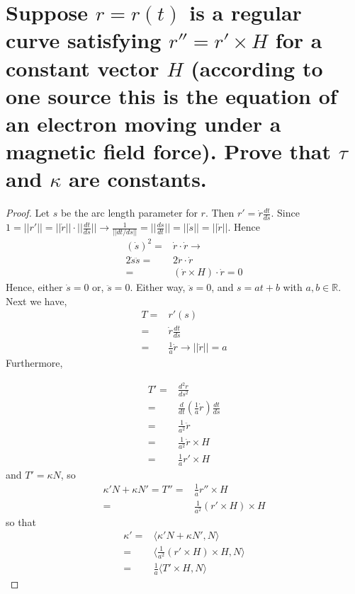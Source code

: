 \documentclass[12pt]{amsart}
\begin{document}
\section{Suppose $r=r(t)$ is a regular curve satisfying $r''=r'\times H$ for a constant vector $H$ (according to one source this is the equation of an electron moving under a magnetic field force). Prove that $\tau$ and $\kappa$ are constants.}
\begin{proof}
Let $s$ be the arc length parameter for $r$. Then $r'=\dot r\frac{dt}{ds}$. Since $1=||r'||=||\dot r||\cdot||\frac{dt}{ds}||\rightarrow\frac{1}{||dt/ds||}=||\frac{ds}{dt}||=||\dot s||=||\dot r||$. Hence 
\begin{align*}
	\left(\dot s\right)^2=&\dot r\cdot\dot r\rightarrow
	\\2\dot s\ddot s=&2\ddot r\cdot\dot r
	\\=&(\dot r\times H)\cdot \dot r=0
\end{align*}
Hence, either $\dot s=0$ or, $\ddot s=0$. Either way, $\ddot s=0$, and $s=at+b$ with $a,b\in\mathbb{R}$. Next we have,
\begin{align*}
	T=&r'(s)
	\\=&\dot r\frac{dt}{ds}
	\\=&\frac{1}{a}\dot r\rightarrow||\dot r||=a
\end{align*}
Furthermore,
\begin{comment}\begin{align*}
	0=&T\cdot N
	\\=&r'\cdot N
\end{align*}
\end{comment}
\begin{align*}
	T'=&\frac{d^2r}{ds^2}
	\\=&\frac{d}{dt}\left(\frac{1}{a}\dot r\right)\frac{dt}{ds}
	\\=&\frac{1}{a^2}\ddot r
	\\=&\frac{1}{a^2}\dot r\times H
	\\=&\frac{1}{a}r'\times H
\end{align*}
and $T'=\kappa N$, so 
\begin{align*}
	\kappa'N+\kappa N'=T''=&\frac{1}{a}r''\times H
	\\=&\frac{1}{a^2}(r'\times H)\times H
\end{align*}
so that
\begin{align*}
	\kappa'=&\langle\kappa'N+\kappa N',N\rangle
	\\=&\langle\frac{1}{a^2}(r'\times H)\times H, N\rangle
	\\=&\frac{1}{a}\langle T'\times H,N\rangle

\end{align*}
\end{proof}
\end{document}
